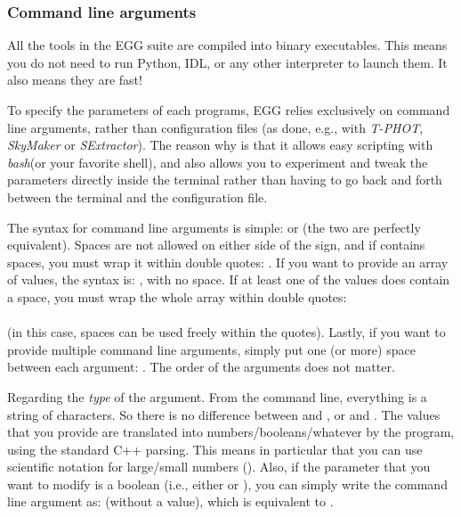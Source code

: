 \documentclass[12pt,a4paper]{article}
\newcommand{\egg}{\textsc{EGG}\xspace}
\newcommand{\skymaker}{\textit{SkyMaker}\xspace}
\newcommand{\sextractor}{\textit{SExtractor}\xspace}
\newcommand{\tphot}{\textit{T-PHOT}\xspace}
\newcommand{\bash}{\textit{bash}\xspace}
\begin{document}
\subsubsection{Command line arguments}

All the tools in the \egg suite are compiled into binary executables. This means you do not need to run Python, IDL, or any other interpreter to launch them. It also means they are fast!

To specify the parameters of each programs, \egg relies exclusively on command line arguments, rather than configuration files (as done, e.g., with \tphot, \skymaker or \sextractor). The reason why is that it allows easy scripting with \bash (or your favorite shell), and also allows you to experiment and tweak the parameters directly inside the terminal rather than having to go back and forth between the terminal and the configuration file.

The syntax for command line arguments is simple:  or  (the two are perfectly equivalent). Spaces are not allowed on either side of the \bashinline{=} sign, and if  contains spaces, you must wrap it within double quotes: . If you want to provide an array of values, the syntax is: , with no space. If at least one of the values does contain a space, you must wrap the whole array within double quotes: \\
\\
(in this case, spaces can be used freely within the quotes). Lastly, if you want to provide multiple command line arguments, simply put one (or more) space between each argument: . The order of the arguments does not matter.

Regarding the \emph{type} of the argument. From the command line, everything is a string of characters. So there is no difference between  and , or  and . The values that you provide are translated into numbers/booleans/whatever by the program, using the standard C++ parsing. This means in particular that you can use scientific notation for large/small numbers (). Also, if the parameter that you want to modify is a boolean (i.e., either  or ), you can simply write the command line argument as:  (without a value), which is equivalent to .
\end{document}
